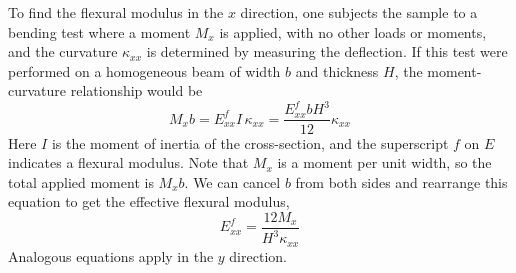 \documentclass[11pt]{article}
\begin{document}
To find the flexural modulus in the $x$ direction, one subjects the sample to a bending test where a moment $M_x$ is applied, with no other loads or moments, and the curvature $\kappa_{xx}$ is determined by measuring the deflection.  If this test were performed on a homogeneous beam of width $b$ and thickness $H$, the moment-curvature relationship would be
\begin{equation}
   M_x b = E^f_{xx} I \, \kappa_{xx} = \frac{E^f_{xx} b H^3}{12} \kappa_{xx}
   \label{momentCurvature}
\end{equation}
Here $I$ is the moment of inertia of the cross-section, and the superscript $f$ on $E$ indicates a flexural modulus.  Note that $M_x$ is a moment per unit width, so the total applied moment is $M_x b$.  We can cancel $b$ from both sides and rearrange this equation to get the effective flexural modulus,
\begin{equation}
   E^f_{xx} = \frac{12 M_x}{H^3 \kappa_{xx}}
   \label{EflexDef}
\end{equation}
Analogous equations apply in the $y$ direction.  
\end{document}
